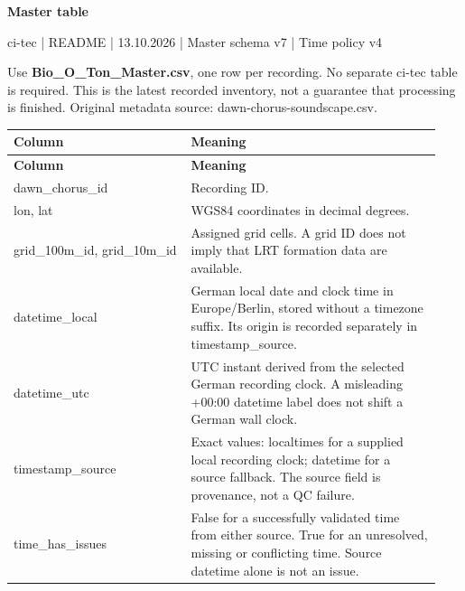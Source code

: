 \documentclass[a4paper,9pt]{extarticle}
\begin{document}
{\Huge\bfseries\color{navy} Master table}\par

ci-tec | README | 13.10.2026 | Master schema v7 | Time policy v4\par

Use \textbf{Bio\_O\_Ton\_Master.csv}, one row per recording. No separate ci-tec table is required. This is the latest recorded inventory, not a guarantee that processing is finished. Original metadata source: dawn-chorus-soundscape.csv.\par

\begingroup\small\begin{longtable}{>{\raggedright\arraybackslash}p{0.39\linewidth}>{\raggedright\arraybackslash}p{0.55\linewidth}}

\rowcolor{navy} \color{white}\bfseries Column & \color{white}\bfseries Meaning \\

\endfirsthead

\rowcolor{navy} \color{white}\bfseries Column & \color{white}\bfseries Meaning \\

\endhead

\rowcolor{pale} dawn\_chorus\_id & Recording ID. \\

lon, lat & WGS84 coordinates in decimal degrees. \\

\rowcolor{pale} grid\_100m\_id, grid\_10m\_id & Assigned grid cells. A grid ID does not imply that LRT formation data are available. \\

datetime\_local & German local date and clock time in Europe/Berlin, stored without a timezone suffix. Its origin is recorded separately in timestamp\_source. \\

\rowcolor{pale} datetime\_utc & UTC instant derived from the selected German recording clock. A misleading +00:00 datetime label does not shift a German wall clock. \\

timestamp\_source & Exact values: localtimes for a supplied local recording clock; datetime for a source fallback. The source field is provenance, not a QC failure. \\

\rowcolor{pale} time\_has\_issues & False for a successfully validated time from either source. True for an unresolved, missing or conflicting time. Source datetime alone is not an issue. \\


\end{longtable}
\end{document}
